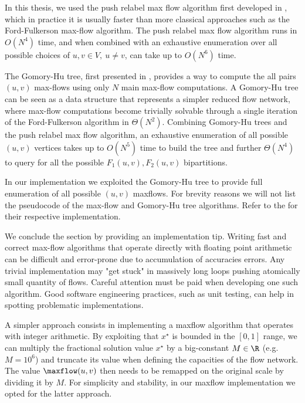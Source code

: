 \medskip

In this thesis,
we used the push relabel max flow algorithm first developed in \cite{goldberg1997},
which in practice it is usually faster than more classical approaches such as the Ford-Fulkerson max-flow algorithm.
The push relabel max flow algorithm runs in $O(N^4)$ time,
and when combined with an exhaustive enumeration over all possible choices of $u, v \in V,\ u \ne v$,
can take up to $O(N^6)$ time.

The Gomory-Hu tree, first presented in \cite{gomory1961},
provides a way to compute the all pairs $(u, v)$ max-flows using only $N$ main max-flow computations.
A Gomory-Hu tree can be seen as a data structure that represents a simpler reduced flow network,
where max-flow computations become trivially solvable
through a single iteration of the Ford-Fulkerson algorithm in $\Theta(N^2)$.
Combining Gomory-Hu trees and the push relabel max flow algorithm,
an exhaustive enumeration of all possible $(u, v)$ vertices takes up to $O(N^5)$ time to build the tree
and further $\Theta(N^4)$ to query for all the possible $F_1(u, v), F_2(u, v)$ bipartitions.

In our implementation
we exploited the Gomory-Hu tree to provide full enumeration of all possible $(u, v)$ maxflows.
For brevity reasons we will not list the pseudocode of the max-flow and Gomory-Hu tree algorithms.
Refer to the  for their respective implementation.

\medskip

We conclude the section by providing an implementation tip.
Writing fast and correct max-flow algorithms that operate directly with floating point arithmetic
can be difficult and error-prone due to accumulation of accuracies errors.
Any trivial implementation may "get stuck" in massively long loops pushing atomically small quantity of flows.
Careful attention must be paid when developing one such algorithm.
Good software engineering practices, such as unit testing, can help in spotting problematic implementations.

A simpler approach consists in implementing a maxflow algorithm that operates with integer arithmetic.
By exploiting that $x^\star$ is bounded in the $[0, 1]$ range,
we can multiply the fractional solution value $x^\star$ by a big-constant $M \in \R$ (e.g. $M = 10^6$)
and truncate its value when defining the capacities of the flow network.
The value $\maxflow(u, v)$ then needs to be remapped on the original scale
by dividing it by $M$.
For simplicity and stability, in our maxflow implementation we opted for the latter approach.


